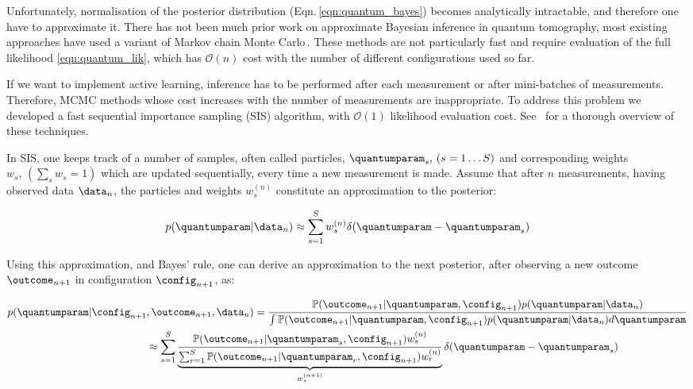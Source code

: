 Unfortunately, normalisation of the posterior distribution (Eqn.\,\eqref{eqn:quantum_bayes}) becomes analytically intractable, and therefore one have to approximate it. There has not been much prior work on approximate Bayesian inference in quantum tomography, most existing approaches have used a variant of Markov chain Monte Carlo\,\cite[][and refs.\ therein]{BayesianTomography}. These methods are not particularly fast and require evaluation of the full likelihood \eqref{eqn:quantum_lik}, which has $\mathcal{O}(n)$ cost with the number of different configurations used so far.

If we want to implement active learning, inference has to be performed after each measurement or after mini-batches of measurements. Therefore, MCMC methods whose cost increases with the number of measurements are inappropriate. To address this problem we developed a fast sequential importance sampling (SIS) algorithm, with $\mathcal{O}(1)$ likelihood evaluation cost. See \,\citep{SMCBook} for a thorough overview of these techniques.

In SIS, one keeps track of a number of samples, often called particles, $\quantumparam_s,\, (s=1\ldots S)$ and corresponding weights $w_s, \, \left( \sum_s w_s = 1 \right)$  which are updated sequentially, every time a new measurement is made. Assume that after $n$ measurements, having observed data $\data_n$, the particles and weights  $w^{(n)}_s$ constitute an approximation to the posterior:	

\begin{equation}
	p(\quantumparam\vert\data_n)\approx \sum_{s=1}^{S}w^{(n)}_s\delta(\quantumparam-\quantumparam_s)\label{eqn:quantum_SISapprox}
\end{equation}

Using this approximation, and Bayes' rule, one can derive an approximation to the next posterior, after observing a new outcome $\outcome_{n+1}$ in configuration $\config_{n+1}$, as:

\begin{align}
	p(\quantumparam\vert\config_{n+1}&,\outcome_{n+1},\data_n) = \frac{\mathbb{P}(\outcome_{n+1}\vert\quantumparam,\config_{n+1})p(\quantumparam\vert\data_n)}{\int \mathbb{P}(\outcome_{n+1}\vert\quantumparam,\config_{n+1})p(\quantumparam\vert\data_n) d\quantumparam}\label{eqn:quantum_SISupdate}\\
	&\approx \sum_{s=1}^{S}\underbrace{\frac{\mathbb{P}(\outcome_{n+1}\vert\quantumparam_s,\config_{n+1})w^{(n)}_s}{\sum_{r=1}^{S}\mathbb{P}(\outcome_{n+1}\vert\quantumparam_r,\config_{n+1})w^{(n)}_r}}_{w^{(n+1)}_s}\delta(\quantumparam-\quantumparam_s)\notag
\end{align}

